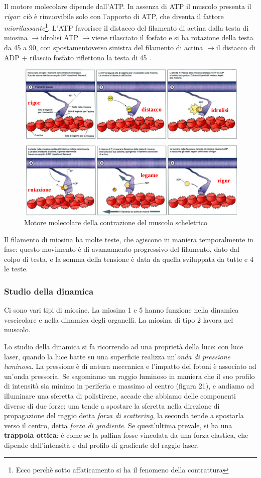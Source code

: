 \documentclass[a4paper,12pt]{article}
\newcommand{\lfreccia}{\ensuremath{\longrightarrow}}
\newcommand{\gradi}{\textcelsius\xspace}
\begin{document}
Il motore molecolare dipende dall'ATP. In assenza di ATP il muscolo presenta il \emph{rigor}: ciò è rimuovibile solo con l'apporto di ATP, che diventa il fattore \emph{miorilassante}\footnote{Ecco perchè sotto affaticamento si ha il fenomeno della contrattura}. L'ATP favorisce il distacco del filamento di actina dalla testa di miosina \lfreccia idrolisi ATP \lfreccia viene rilasciato il fosfato e si ha rotazione della testa da 45\gradi a 90\gradi, con spostamentoverso sinistra del filamento di actina \lfreccia il distacco di ADP + rilascio fosfato riflettono la testa di 45 \gradi.
\begin{figure}[H]
\centering
\includegraphics[scale=0.4]{immagine/motore.jpg}
\caption{Motore molecolare della contrazione del muscolo scheletrico}
\end{figure}

Il filamento di miosina ha molte teste, che agiscono in maniera temporalmente in fase: questo movimento è di avanzamento progressivo del filamento, dato dal colpo di testa, e la somma della tensione è data da quella sviluppata da tutte e 4 le teste.

\subsubsection{Studio della dinamica}
Ci sono vari tipi di miosine. La miosina 1 e 5 hanno funzione nella dinamica vescicolare e nella dinamica degli organelli. La miosina di tipo 2 lavora nel muscolo. 

Lo studio della dinamica si fa ricorrendo ad una proprietà della luce: con luce laser, quando la luce batte su una superficie realizza un'\emph{onda di pressione luminosa}. La pressione è di natura meccanica e l'impatto dei fotoni è associato ad un'onda pressoria. Se sagomiamo un raggio luminoso in maniera che il suo profilo di intensità sia minimo in periferia e massimo al centro (figura 21), e andiamo ad illuminare una sferetta di polistirene, accade che abbiamo delle componenti diverse di due forze: una tende a spostare la sferetta nella direzione di propagazione del raggio detta \emph{forza di scattering}, la seconda tende a spostarla verso il centro, detta \emph{forza di gradiente}. Se quest'ultima prevale, si ha una \textbf{trappola ottica}: è come se la pallina fosse vincolata da una forza elastica, che dipende dall'intensità e dal profilo di gradiente del raggio laser.
\end{document}
